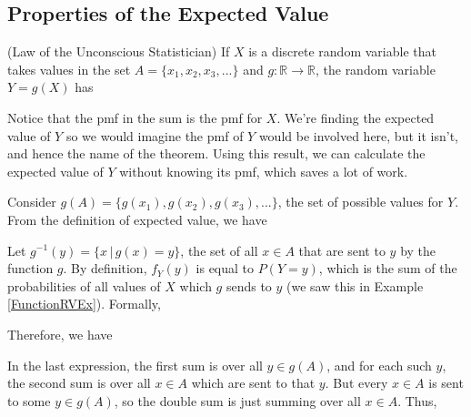 \subsection*{Properties of the Expected Value}

\begin{thm}\label{LawUnconsciousStatistician}
(Law of the Unconscious Statistician) If $X$ is a discrete random variable that takes values in the set $A = \{x_1, x_2, x_3, ...\}$ and $g: \mathbb{R} \to \mathbb{R}$, the random variable $Y = g(X)$ has 
\end{thm}
\par
Notice that the pmf in the sum is the pmf for $X$. We're finding the expected value of $Y$ so we would imagine the pmf of $Y$ would be involved here, but it isn't, and hence the name of the theorem. Using this result, we can calculate the expected value of $Y$ without knowing its pmf, which saves a lot of work.
\par
\vspace{0.5em}
\begin{pf}
Consider $g(A) = \{g(x_1), g(x_2), g(x_3), ...\}$, the set of possible values for $Y$. From the definition of expected value, we have
\par
\noindent Let $g^{-1}(y) = \{x \, | \, g(x) = y\}$, the set of all $x \in A$ that are sent to $y$ by the function $g$. By definition, $f_Y(y)$ is equal to $P(Y=y)$, which is the sum of the probabilities of all values of $X$ which $g$ sends to $y$ (we saw this in Example \ref{FunctionRVEx}). Formally, 
\par
\noindent Therefore, we have
\par
\noindent In the last expression, the first sum is over all $y \in g(A)$, and for each such $y$, the second sum is over all $x \in A$ which are sent to that $y$. But every $x \in A$ is sent to some $y \in g(A)$, so the double sum is just summing over all $x \in A$. Thus,
\end{pf}

